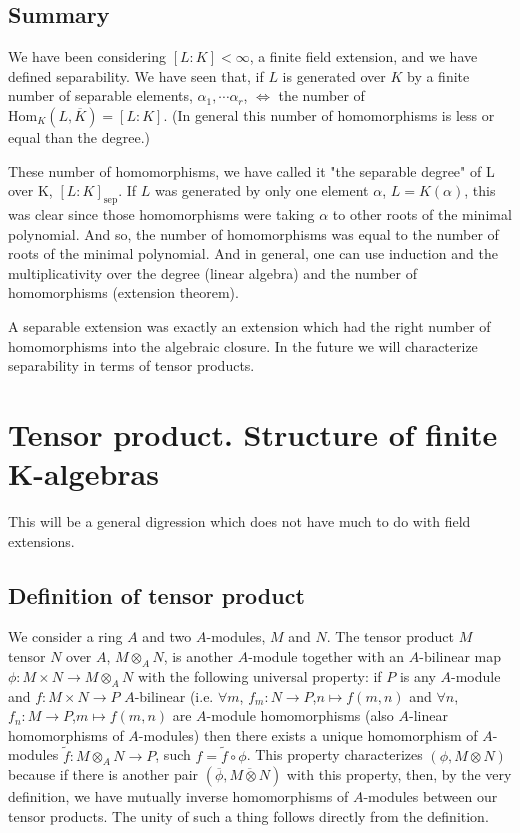 \section{Summary}
We have been considering $[L:K]<\infty$, a finite field extension, and we have defined separability. We have seen that, if $L$ is generated over $K$ by a finite number of separable elements, $\alpha_1,\cdots\alpha_r$, $\iff$ the number of $\text{Hom}_K(L,\overbar{K})=[L:K]$. (In general this number of homomorphisms is less or equal than the degree.) 

These number of homomorphisms, we have called it "the separable degree" of L over K, $[L:K]_{\text{sep}}$. If $L$ was generated by only one element $\alpha$, $L=K(\alpha)$, this was clear since those homomorphisms were taking $\alpha$ to other roots of the minimal polynomial. And so, the number of homomorphisms was equal to the number of roots of the minimal polynomial. And in general, one can use induction and the multiplicativity over the degree (linear algebra) and the number of homomorphisms (extension theorem). 

A separable extension was exactly an extension which had the right number of homomorphisms into the algebraic closure. In the future we will characterize separability in terms of tensor products.

\chapter{Tensor product. Structure of finite K-algebras}

This will be a general digression which does not have much to do with field extensions.

\section{Definition of tensor product}
We consider a ring $A$ and two $A$-modules, $M$ and $N$. The tensor product $M$ tensor $N$ over $A$, $M\otimes_A N$, is another $A$-module together with an $A$-bilinear map $\phi:M\times N\to M\otimes_A N$ with the following universal property: if $P$ is any $A$-module and $f:M\times N\to P$ $A$-bilinear (i.e. $\forall m$, $f_m:N\to P$,$n\mapsto f(m,n)$ and $\forall n$, $f_n:M\to P$,$m\mapsto f(m,n)$ are $A$-module homomorphisms (also $A$-linear homomorphisms of $A$-modules) then there exists a unique homomorphism of $A$-modules $\widetilde{f}:M\otimes_A N\to P$, such $f=\widetilde{f}\circ \phi$. This property characterizes $(\phi,M\otimes N)$ because if there is another pair $(\overbar{\phi},\overbar{M\otimes N})$ with this property, then, by the very definition, we have mutually inverse homomorphisms of $A$-modules between our tensor products. The unity of such a thing follows directly from the definition. 

